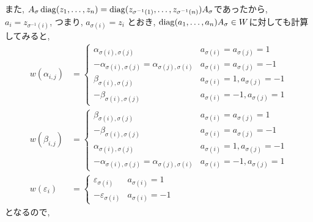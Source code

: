 また,
$A_\sigma \operatorname{diag}(z_1,\ldots,z_n)=\operatorname{diag}(z_{\sigma^{-1}(1)},\ldots,z_{\sigma^{-1}(n)})A_\sigma $であったから, $a_i=z_{\sigma^{-1}(i)}$, つまり,
 $a_{\sigma(i)}=z_{i}$
とおき, $\operatorname{diag}(a_1,\ldots,a_n)A_\sigma\in W$に対しても計算してみると,
\begin{align*}
  w(\alpha_{i,j})&=
  \begin{cases}
    \alpha_{\sigma(i),\sigma(j)}&a_{\sigma(i)}=a_{\sigma(j)}=1\\
    -\alpha_{\sigma(i),\sigma(j)}=\alpha_{\sigma(j),\sigma(i)}&a_{\sigma(i)}=a_{\sigma(j)}=-1\\
    \beta_{\sigma(i),\sigma(j)}&a_{\sigma(i)}=1,a_{\sigma(j)}=-1\\
    -\beta_{\sigma(i),\sigma(j)}&a_{\sigma(i)}=-1,a_{\sigma(j)}=1
  \end{cases}\\
  w(\beta_{i,j})&=
  \begin{cases}
    \beta_{\sigma(i),\sigma(j)}&a_{\sigma(i)}=a_{\sigma(j)}=1\\
    -\beta_{\sigma(i),\sigma(j)}&a_{\sigma(i)}=a_{\sigma(j)}=-1\\
    \alpha_{\sigma(i),\sigma(j)}&a_{\sigma(i)}=1,a_{\sigma(j)}=-1\\
    -\alpha_{\sigma(i),\sigma(j)}=\alpha_{\sigma(j),\sigma(i)}&a_{\sigma(i)}=-1,a_{\sigma(j)}=1
  \end{cases}\\
  w(\varepsilon_{i})&=
  \begin{cases}
    \varepsilon_{\sigma(i)}&a_{\sigma(i)}=1\\
    -\varepsilon_{\sigma(i)}&a_{\sigma(i)}=-1
  \end{cases}
\end{align*}
となるので,
